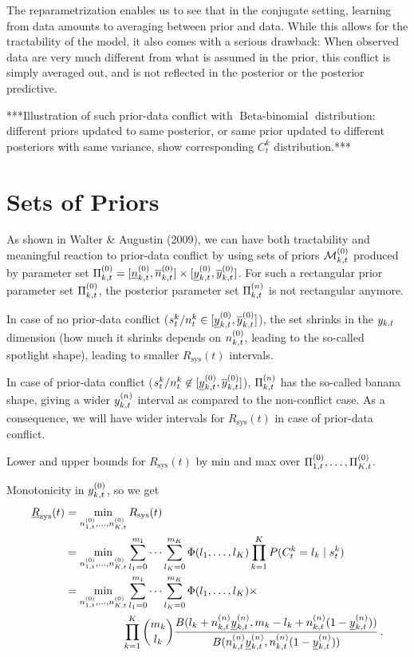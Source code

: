 \documentclass[authoryear, 12pt, a4paper]{elsarticle}
\newcommand{\ul}[1]{\underline{#1}}
\newcommand{\Rsys}{R_\text{sys}}
\newcommand{\lRsys}{\ul{R}_\text{sys}}
\newcommand{\bebin}{\operatorname{Beta-binomial}}
\begin{document}
The reparametrization enables us to see that in the conjugate setting,
learning from data amounts to averaging between prior and data.
While this allows for the tractability of the model,
it also comes with a serious drawback:
When observed data are very much different from what is assumed in the prior,
this conflict is simply averaged out,
and is not reflected in the posterior or the posterior predictive.
 
***Illustration of such prior-data conflict with $\bebin$ distribution:
different priors updated to same posterior,
or same prior updated to different posteriors with same variance,
show corresponding $C^k_t$ distribution.***



\section{Sets of Priors}

As shown in Walter \& Augustin (2009),
we can have both tractability and meaningful reaction to prior-data conflict
by using sets of priors $\mathcal{M}^{(0)}_{k,t}$ produced by parameter set $\PktZ = [\nktzl, \nktzu] \times [\yktzl, \yktzu]$. 
For such a rectangular prior parameter set $\Pi^{(0)}_{k,t}$,
the posterior parameter set $\Pi^{(n)}_{k,t}$ is not rectangular anymore.

In case of no prior-data conflict ($s^k_t/n^k_t \in [\yktzl, \yktzu]$),
the set shrinks in the $y_{k,t}$ dimension
(how much it shrinks depends on $n^{(0)}_{k,t}$, leading to the so-called spotlight shape),
leading to smaller $\Rsys(t)$ intervals.

In case of prior-data conflict ($s^k_t/n^k_t \not\in [\yktzl, \yktzu]$),
$\Pi^{(n)}_{k,t}$ has the so-called banana shape,
giving a wider $y^{(n)}_{k,t}$ interval as compared to the non-conflict case. 
As a consequence, we will have wider intervals for $\Rsys(t)$ in case of prior-data conflict.

Lower and upper bounds for $\Rsys(t)$ by min and max over $\Pi^{(0)}_{1,t}, \ldots, \Pi^{(0)}_{K,t}$.

Monotonicity in $y^{(0)}_{k,t}$, so we get
\begin{align*}
\lRsys(t)
 &= \min_{\nz_{1,t},\ldots,\nz_{K,t}} \Rsys(t) \\
 &= \min_{\nz_{1,t},\ldots,\nz_{K,t}} 
    \sum_{l_1=0}^{m_1} \cdots \sum_{l_K=0}^{m_K} \Phi(l_1, \ldots, l_K)
                                                 \prod_{k=1}^K P(C^k_t = l_k \mid s^k_t) \\
 &= \min_{\nz_{1,t},\ldots,\nz_{K,t}} 
    \sum_{l_1=0}^{m_1} \cdots \sum_{l_K=0}^{m_K} \Phi(l_1, \ldots, l_K) \times \\ & \hspace*{12ex}
    \prod_{k=1}^K {m_k \choose l_k} \frac{B(l_k + \nn_{k,t}\ynl_{k,t}, m_k - l_k + \nn_{k,t}(1-\ynl_{k,t}))}
                                         {B(\nn_{k,t}\ynl_{k,t}, \nn_{k,t}(1-\ynl_{k,t}))} \,.
\end{align*}
\end{document}
